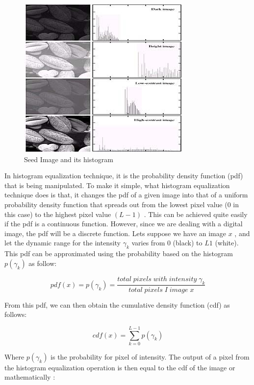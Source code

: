 \begin{figure}
	\centering
	\includegraphics[scale=1]{images/ch3/histogramEqualization.jpg}
	\caption{Seed Image and its histogram}
	\label{fig:histogramEqualization}
\end{figure}

In histogram equalization technique, it is the probability density function (pdf)
that is being manipulated. To make it simple, what histogram equalization technique
does is that, it changes the pdf of a given image into that of a uniform probability
density function that spreads out from the lowest pixel value ($0$ in this case) to
the highest pixel value $(L − 1)$ . This can be achieved quite easily if the pdf is a
continuous function\cite{he1}. However, since we are dealing with a digital image, the pdf
will be a discrete function. Lets suppose we have an image $x$ , and let the dynamic
range for the intensity $\gamma_{k}$ varies from $0$ (black) to $L1$ (white). This pdf can be
approximated using the probability based on the histogram $p(\gamma_{k})$ as follow:

\begin{equation}
	pdf(x)=p(\gamma_{k})= \frac{total\;pixels\;with\;intensity\; \gamma_{k}}{total\;pixels\;I\;image\;x}
\end{equation}

From this pdf, we can then obtain the cumulative density function (cdf) as follows:

\begin{equation}
	cdf(x)=\sum_{k=0}^{L-1}p(\gamma_{k})
\end{equation}

Where $p(\gamma_{k})$ is the probability for pixel of intensity. The output of a pixel from
the histogram equalization operation is then equal to the cdf of the image or mathematically\cite{he2} :

